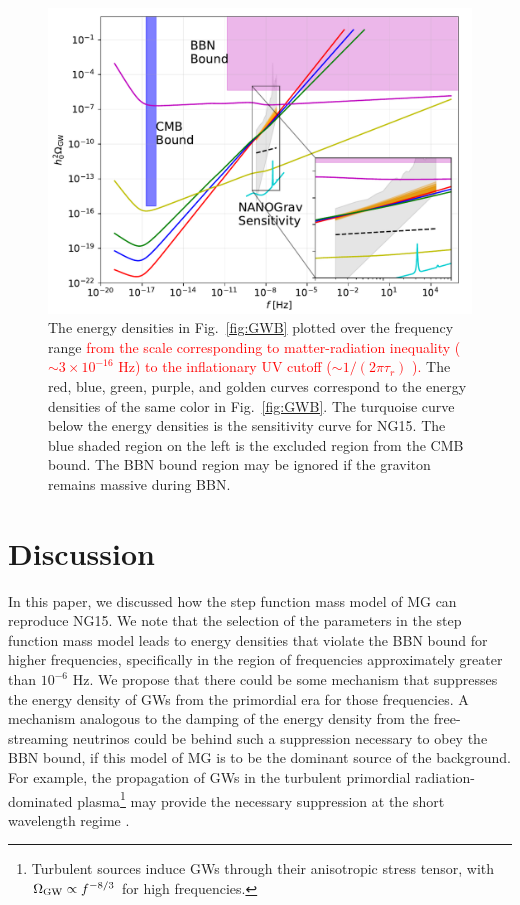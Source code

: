 \documentclass[prd,twocolumn,aps,psfig,nofootinbib,nobibnotes,superscriptaddress,preprintnumbers,times]{revtex4-2}
\def\red{\textcolor{red}}
\begin{document}
\begin{figure}[ht]
    \includegraphics[width=\linewidth]{fig4.pdf}
    \caption{The energy densities in Fig.\ \ref{fig:GWB} plotted over the frequency range \red{from the scale corresponding to matter-radiation inequality ($\sim 3\times10^{-16}$ Hz) to the inflationary UV cutoff ($\sim 1/(2\pi\tau_r)$ \cite{Fujita:2018ehq}).} The red, blue, green, purple, and golden curves correspond to the energy densities of the same color in Fig.\ \ref{fig:GWB}. The turquoise curve below the energy densities is the sensitivity curve for NG15. The blue shaded region on the left is the excluded region from the CMB bound. The BBN bound region may be ignored if the graviton remains massive during BBN.} 
    \label{fig:supp}
\end{figure}

\section{Discussion}\label{sec:discussion}
In this paper, we discussed how the step function mass model of MG can reproduce NG15. We note that the selection of the parameters in the step function mass model leads to energy densities that violate the BBN bound for higher frequencies, specifically in the region of frequencies approximately greater than $10^{-6}$ Hz. We propose that there could be some mechanism that suppresses the energy density of GWs from the primordial era for those frequencies. A mechanism analogous to the damping of the energy density from the free-streaming neutrinos \cite{Durrer:1997ta,Weinberg:2003ur} could be behind such a suppression necessary to obey the BBN bound, if this model of MG is to be the dominant source of the background. For example, the propagation of GWs in the turbulent primordial radiation-dominated plasma\footnote{Turbulent sources induce GWs through their anisotropic stress tensor, with $\Omega_{\rm GW} \propto f^{-8/3}$ for high frequencies.} \cite{RoperPol:2019wvy} may provide the necessary suppression at the short wavelength regime \cite{Deryagin:1986}. 
\end{document}
